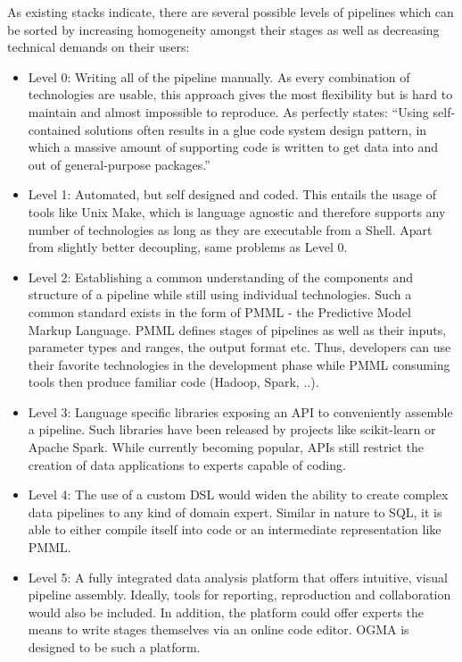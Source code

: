 As existing stacks indicate, there are several possible levels of pipelines which can be sorted by increasing homogeneity amongst their stages as well as decreasing technical demands on their users:

\begin{itemize}
	\item Level 0: Writing all of the pipeline manually. As every combination of technologies are usable, this approach gives the most flexibility but is hard to maintain and almost impossible to reproduce. As \citep{MLTechnicalDebt} perfectly states: ``Using self-contained solutions often results in a glue code system design pattern, in which a massive amount of supporting code is written to get data into and out of general-purpose packages.''
	
	\item Level 1: Automated, but self designed and coded. This entails the usage of tools like Unix Make, which is language agnostic and therefore supports any number of technologies as long as they are executable from a Shell. Apart from slightly better decoupling, same problems as Level 0.
	
	\item Level 2: Establishing a common understanding of the components and structure of a pipeline while still using individual technologies. Such a common standard exists in the form of PMML - the Predictive Model Markup Language. PMML defines stages of pipelines as well as their inputs, parameter types and ranges, the output format etc. Thus, developers can use their favorite technologies in the development phase while PMML consuming tools then produce familiar code (Hadoop, Spark, ..).
	
	\item Level 3: Language specific libraries exposing an API to conveniently assemble a pipeline. Such libraries have been released by projects like scikit-learn or Apache Spark. While currently becoming popular, APIs still restrict the creation of data applications to experts capable of coding.
	
	\item Level 4: The use of a custom DSL would widen the ability to create complex data pipelines to any kind of domain expert. Similar in nature to SQL, it is able to either compile itself into code or an intermediate representation like PMML.
	
	\item Level 5: A fully integrated data analysis platform that offers intuitive, visual pipeline assembly. Ideally, tools for reporting, reproduction and collaboration would also be included. In addition, the platform could offer experts the means to write stages themselves via an online code editor. OGMA is designed to be such a platform.
\end{itemize}


